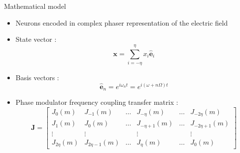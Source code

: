 \begin{frame}{Mathematical model}
	\begin{itemize}
		\item Neurons encoded in complex phaser representation of the electric field
		\item State vector :
		\begin{equation*}
			\mathbf{x} = \sum_{i=-\eta}^\eta x_i \hat{\mathbf{e}}_i
		\end{equation*}
		\item Basis vectors :
		\begin{equation*}
			\hat{\mathbf{e}}_n = e^{i\omega_n t} = e^{i (\omega+n \Omega)t}
		\end{equation*}
		\item Phase modulator frequency coupling transfer matrix :
		\begin{equation*}
			\mathbf{J} = \begin{bmatrix}
				J_0(m) & J_{-1}(m) & \dots & J_{-\eta}(m) & \dots & J_{-2\eta}(m) \\
				J_1(m) & J_0(m) & \dots & J_{-\eta+1}(m) & \dots & J_{-2\eta+1}(m) \\
				\vdots & \vdots &  & \vdots &  & \vdots \\
				J_{2\eta}(m) & J_{2\eta-1}(m) & \dots & J_\eta(m) & \dots & J_0(m)
			\end{bmatrix}
		\end{equation*}
	\end{itemize}
\end{frame}

